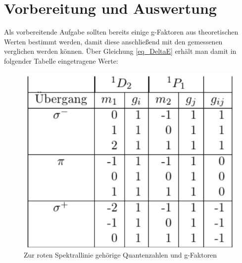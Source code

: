 \section{Vorbereitung und Auswertung}
Als vorbereitende Aufgabe sollten bereits einige g-Faktoren aus theoretischen Werten bestimmt werden, damit diese anschließend mit den gemessenen verglichen werden können. Über Gleichung \eqref{eq_DeltaE} erhält man damit in folgender Tabelle eingetragene Werte:
\begin{figure}[htbp]
\includegraphics[scale=0.5]{../pics/theo1.pdf}
\caption{Zur roten Spektrallinie gehörige Quantenzahlen und g-Faktoren}
\label{tab_über_r}
\end{figure}

